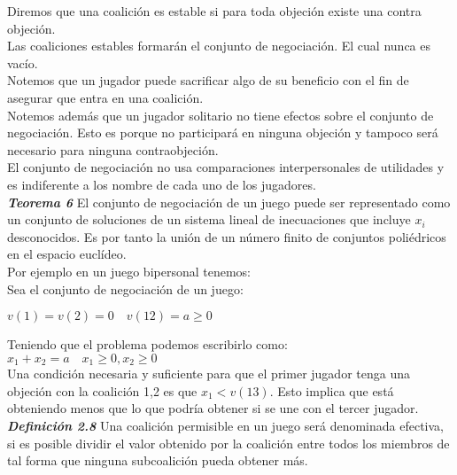 \documentclass[10pt,a4paper]{book}
\begin{document}
Diremos que una coalición es estable si para toda objeción existe una contra objeción.\\
Las coaliciones estables formarán el conjunto de negociación. El cual nunca es vacío.\\

Notemos que un jugador puede sacrificar algo de su beneficio con el fin de asegurar que entra en una coalición.\\

Notemos además que un jugador solitario no tiene efectos sobre el conjunto de negociación. Esto es porque no participará en ninguna objeción y tampoco será necesario para ninguna contraobjeción.\\

El conjunto de negociación no usa comparaciones interpersonales de utilidades y es indiferente a los nombre de cada uno de los jugadores.\\


\textit{\textbf{Teorema 6}} El conjunto de negociación de un juego puede ser representado como un conjunto de soluciones de un sistema lineal de inecuaciones que incluye $x_i$ desconocidos. Es por tanto la unión de un número finito de conjuntos poliédricos en el espacio euclídeo.\\

Por ejemplo en un juego bipersonal tenemos:\\

Sea el conjunto de negociación de un juego:\\

\begin{center}

$v(1)=v(2)=0 \quad v(12)=a \geq 0 $

\end{center}

Teniendo que el problema podemos escribirlo como:\\

$x_1 + x_2 =a \quad x_1 \geq 0 , x_2 \geq 0 $\\


Una condición necesaria y suficiente para que el primer jugador tenga una objeción con la coalición 1,2 es que $x_1 < v(13)$. Esto implica que está obteniendo menos que lo que podría obtener si se une con el tercer jugador.\\



\textit{\textbf{Definición 2.8}} Una coalición permisible en un juego será denominada efectiva, si es posible dividir el valor obtenido por la coalición entre todos los miembros de tal forma que ninguna subcoalición pueda obtener más.\\
\end{document}

